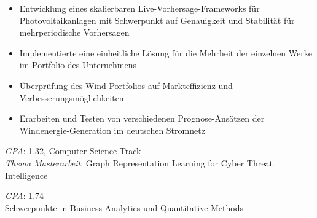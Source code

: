 \documentclass[9pt,a4paper,ragged2e]{altacv}
\begin{document}
    \divider

    \begin{itemize}
        \item Entwicklung eines skalierbaren Live-Vorhersage-Frameworks für  Photovoltaikanlagen mit Schwerpunkt auf Genauigkeit und Stabilität für mehrperiodische Vorhersagen
        \item Implementierte eine einheitliche Lösung für die Mehrheit der einzelnen Werke im Portfolio des Unternehmens
    \end{itemize}

    \divider

    \begin{itemize}
        \item Überprüfung des Wind-Portfolios auf Markteffizienz und \\ Verbesserungsmöglichkeiten
        \item Erarbeiten und Testen von verschiedenen Prognose-Ansätzen der Windenergie-Generation im deutschen Stromnetz
    \end{itemize}

    \medskip\medskip\medskip

    \textit{GPA}: 1.32, Computer Science Track \\ %
    \textit{Thema Masterarbeit}: Graph Representation Learning for Cyber Threat Intelligence\\

    \divider

    \textit{GPA}: 1.74 \\%
    Schwerpunkte in Business Analytics und Quantitative Methods \\

    \medskip\medskip\medskip
    \clearpage
\end{document}

